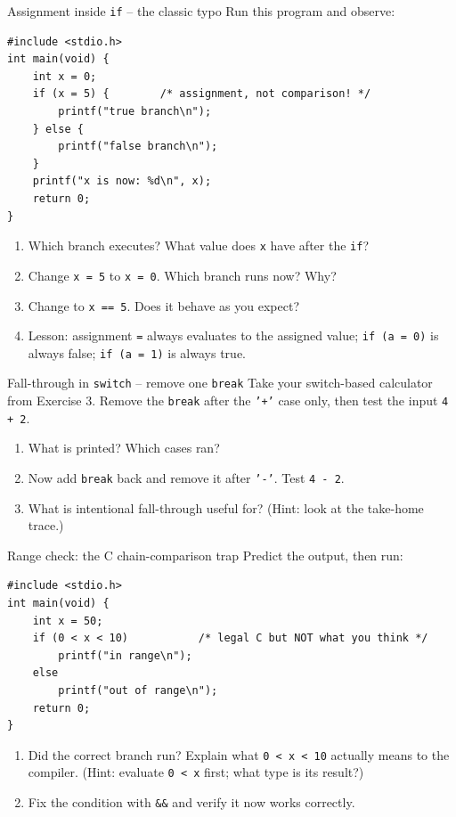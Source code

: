\documentclass[11pt]{article}
\begin{document}
\begin{tryit}{Assignment inside \texttt{if} -- the classic typo}
Run this program and observe:
\begin{lstlisting}
#include <stdio.h>
int main(void) {
    int x = 0;
    if (x = 5) {        /* assignment, not comparison! */
        printf("true branch\n");
    } else {
        printf("false branch\n");
    }
    printf("x is now: %d\n", x);
    return 0;
}
\end{lstlisting}
\begin{enumerate}[nosep,leftmargin=*]
  \item Which branch executes? What value does \texttt{x} have after the \texttt{if}?
  \item Change \texttt{x = 5} to \texttt{x = 0}. Which branch runs now? Why?
  \item Change to \texttt{x == 5}. Does it behave as you expect?
  \item Lesson: assignment \texttt{=} always evaluates to the assigned value;
        \texttt{if (a = 0)} is always false; \texttt{if (a = 1)} is always true.
\end{enumerate}
\end{tryit}

\begin{tryit}{Fall-through in \texttt{switch} -- remove one \texttt{break}}
Take your switch-based calculator from Exercise 3. Remove the \texttt{break} after
the \texttt{'+'} case only, then test the input \texttt{4 + 2}.
\begin{enumerate}[nosep,leftmargin=*]
  \item What is printed? Which cases ran?
  \item Now add \texttt{break} back and remove it after \texttt{'-'}. Test \texttt{4 - 2}.
  \item What is intentional fall-through useful for? (Hint: look at the take-home trace.)
\end{enumerate}
\end{tryit}

\begin{tryit}{Range check: the C chain-comparison trap}
Predict the output, then run:
\begin{lstlisting}
#include <stdio.h>
int main(void) {
    int x = 50;
    if (0 < x < 10)           /* legal C but NOT what you think */
        printf("in range\n");
    else
        printf("out of range\n");
    return 0;
}
\end{lstlisting}
\begin{enumerate}[nosep,leftmargin=*]
  \item Did the correct branch run? Explain what \texttt{0 < x < 10} actually means
        to the compiler. (Hint: evaluate \texttt{0 < x} first; what type is its result?)
  \item Fix the condition with \texttt{\&\&} and verify it now works correctly.
\end{enumerate}
\end{tryit}
\end{document}
